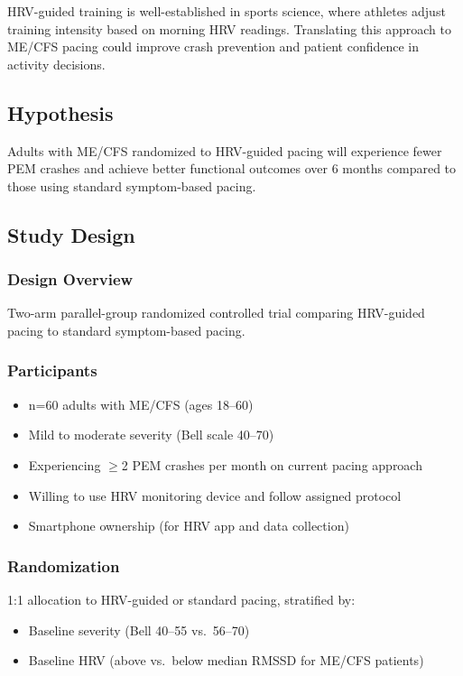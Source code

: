 HRV-guided training is well-established in sports science, where athletes adjust training intensity based on morning HRV readings. Translating this approach to ME/CFS pacing could improve crash prevention and patient confidence in activity decisions.

\subsection{Hypothesis}

\begin{hypothesis}
Adults with ME/CFS randomized to HRV-guided pacing will experience fewer PEM crashes and achieve better functional outcomes over 6 months compared to those using standard symptom-based pacing.
\end{hypothesis}

\subsection{Study Design}

\subsubsection{Design Overview}
Two-arm parallel-group randomized controlled trial comparing HRV-guided pacing to standard symptom-based pacing.

\subsubsection{Participants}
\begin{itemize}
    \item n=60 adults with ME/CFS (ages 18--60)
    \item Mild to moderate severity (Bell scale 40--70)
    \item Experiencing $\geq$2 PEM crashes per month on current pacing approach
    \item Willing to use HRV monitoring device and follow assigned protocol
    \item Smartphone ownership (for HRV app and data collection)
\end{itemize}

\subsubsection{Randomization}
1:1 allocation to HRV-guided or standard pacing, stratified by:
\begin{itemize}
    \item Baseline severity (Bell 40--55 vs.\ 56--70)
    \item Baseline HRV (above vs.\ below median RMSSD for ME/CFS patients)
\end{itemize}

